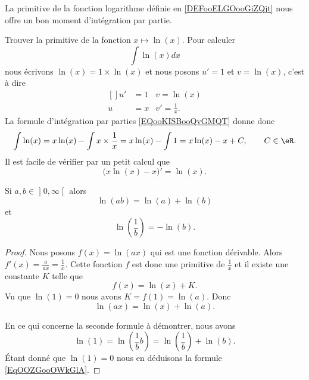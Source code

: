 \begin{example}\label{primln}
    La primitive de la fonction logarithme définie en \ref{DEFooELGOooGiZQjt} nous offre un bon moment d'intégration par partie.

    Trouver la primitive de la fonction \( x\mapsto \ln(x)\). Pour calculer
    \begin{equation}
        \int\ln(x)dx
    \end{equation}
    nous écrivons \( \ln(x)=1\times \ln(x)\) et nous posons \( u'=1\) et \( v=\ln(x)\), c'est à dire
    \begin{equation}
        \begin{aligned}[]
            u'&=1&v=\ln(x)\\
            u&=x&v'=\frac{1}{ x }.
        \end{aligned}
    \end{equation}
    La formule d'intégration par parties \eqref{EQooKISBooQvGMQT} donne donc 
    \begin{equation}
        \int \ln(x)=x\ln(x)-\int x\times \frac{1}{ x }=x\ln(x)-\int 1=x\ln(x)-x+C, \qquad C\in\eR.
    \end{equation}
    Il est facile de vérifier par un petit calcul que
    \begin{equation}
        \big( x\ln(x)-x \big)'=\ln(x).
    \end{equation}
\end{example}

\begin{lemma}   \label{LemPEYJooEZlueU}
Si \( a,b\in\mathopen] 0 , \infty \mathclose[\) alors
    \begin{equation}
        \ln(ab)=\ln(a)+\ln(b)
    \end{equation}
    et
    \begin{equation}    \label{EqOOZGooOWkGlA}
        \ln\left( \frac{1}{ b } \right)=-\ln(b).
    \end{equation}
\end{lemma}

\begin{proof}
    Nous posons \( f(x)=\ln(ax)\) qui est une fonction dérivable. Alors \( f'(x)=\frac{ a }{ ax }=\frac{1}{ x }\). Cette fonction \( f\) est donc une primitive de \( \frac{1}{ x }\) et il existe une constante \( K\) telle que
    \begin{equation}
        f(x)=\ln(x)+K.
    \end{equation}
    Vu que \( \ln(1)=0\) nous avons \( K=f(1)= \ln(a)\). Donc
    \begin{equation}
        \ln(ax)=\ln(x)+\ln(a).
    \end{equation}

    En ce qui concerne la seconde formule à démontrer, nous avons
    \begin{equation}
        \ln(1)=\ln\left( \frac{1}{ b }b \right)=\ln\left( \frac{1}{ b } \right)+\ln(b).
    \end{equation}
    Étant donné que $\ln(1)=0$ nous en déduisons la formule \eqref{EqOOZGooOWkGlA}.
\end{proof}

